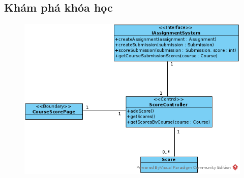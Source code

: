 \documentclass[./../main_file.tex]{subfiles}
\begin{document}
\subsection{Khám phá khóa học}
\begin{figure}[H]
	\centering
	\includegraphics[width=\linewidth]{./images/define_operations/ucd_op_ss_check_course_progress.png}
\end{figure}
\end{document}
